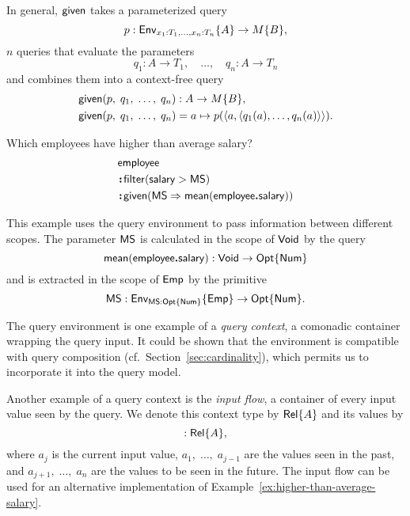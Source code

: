In general, $\mathsf{given}$ takes a parameterized query
\begin{equation*}
    p : \mathsf{Env}_{x_1:T_1,\ldots,x_n:T_n}{\left\{A\right\}} \to M{\left\{B\right\}},
\end{equation*}
$n$ queries that evaluate the parameters
\begin{equation*}
    q_1 : A \to T_1,\quad \ldots,\quad q_n : A \to T_n
\end{equation*}
and combines them into a context-free query
\begin{align*}
    & \mathsf{given}(p,\; q_1,\; \ldots,\; q_n) : A \to M{\left\{B\right\}}, \\
    & \mathsf{given}(p,\; q_1,\; \ldots,\; q_n) = a \mapsto p(\langle a, \langle q_1(a), \ldots, q_n(a) \rangle \rangle).
\end{align*}

\begin{demo}
    \label{ex:higher-than-average-salary}
    Which employees have higher than average salary?
    \begin{align*}
        & \mathsf{employee} \\
        & \!\boldsymbol{:}\!\mathsf{filter}(\mathsf{salary} > \mathsf{MS}) \\
        & \!\boldsymbol{:}\!\mathsf{given}(\mathsf{MS} \Rightarrow \mathsf{mean}(\mathsf{employee}\boldsymbol{.}\mathsf{salary}))
    \end{align*}
\end{demo}

This example uses the query environment to pass information between different
scopes.  The parameter $\mathsf{MS}$ is calculated in the scope of $\mathsf{Void}$ by
the query
\begin{equation*}
    \mathsf{mean}(\mathsf{employee}\boldsymbol{.}\mathsf{salary}) : \mathsf{Void} \to \mathsf{Opt}{\left\{\mathsf{Num}\right\}}
\end{equation*}
and is extracted in the scope of $\mathsf{Emp}$ by the primitive
\begin{equation*}
    \mathsf{MS} : \mathsf{Env}_{\mathsf{MS}:\mathsf{Opt}{\left\{\mathsf{Num}\right\}}}{\left\{\mathsf{Emp}\right\}} \to \mathsf{Opt}{\left\{\mathsf{Num}\right\}}.
\end{equation*}

The query environment is one example of a \emph{query context}, a comonadic
container wrapping the query input.  It could be shown that the environment is
compatible with query composition (cf.~Section~\ref{sec:cardinality}), which
permits us to incorporate it into the query model.

Another example of a query context is the \emph{input flow}, a container of
every input value seen by the query.  We denote this context type by $\mathsf{Rel}{\left\{A\right\}}$
and its values by
\begin{equation*}
    [a_1,\;\ldots,\selected{a_j},\;\ldots,\;a_n] : \Rel{A},
\end{equation*}
where $a_j$ is the current input value, $a_1,\;\ldots,\;a_{j-1}$ are the values
seen in the past, and $a_{j+1},\;\ldots,\;a_n$ are the values to be seen in the
future.  The input flow can be used for an alternative implementation of
Example~\ref{ex:higher-than-average-salary}.

